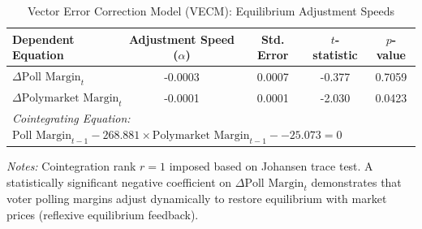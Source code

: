 \begin{table}[htbp]
\centering
\caption{Vector Error Correction Model (VECM): Equilibrium Adjustment Speeds}
\label{tab:vecm}
\begin{tabular}{lcccc}
\hline\hline
Dependent Equation & Adjustment Speed ($\alpha$) & Std. Error & $t$-statistic & $p$-value \\
\hline
$\Delta \text{Poll Margin}_t$ & -0.0003 & 0.0007 & -0.377 & 0.7059 \\
$\Delta \text{Polymarket Margin}_t$ & -0.0001 & 0.0001 & -2.030 & 0.0423 \\
\hline
\multicolumn{5}{l}{\textit{Cointegrating Equation:} $\text{Poll Margin}_{t-1} - 268.881 \times \text{Polymarket Margin}_{t-1} - -25.073 = 0$} \\
\hline\hline
\end{tabular}
\begin{minipage}{0.95\textwidth}
\vspace{1ex}
\footnotesize
\textit{Notes:} Cointegration rank $r=1$ imposed based on Johansen trace test. A statistically significant negative coefficient on $\Delta \text{Poll Margin}_t$ demonstrates that voter polling margins adjust dynamically to restore equilibrium with market prices (reflexive equilibrium feedback).
\end{minipage}
\end{table}
